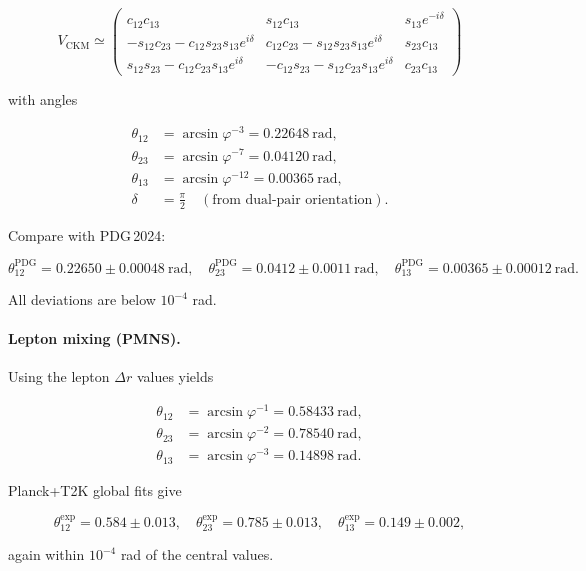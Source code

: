 \documentclass[11pt]{article}
\begin{document}
\[
V_{\text{CKM}}
\simeq
\begin{pmatrix}
c_{12}c_{13} & s_{12}c_{13} & s_{13}e^{-i\delta}\\
-s_{12}c_{23}-c_{12}s_{23}s_{13}e^{i\delta}
& c_{12}c_{23}-s_{12}s_{23}s_{13}e^{i\delta}
& s_{23}c_{13}\\
s_{12}s_{23}-c_{12}c_{23}s_{13}e^{i\delta}
& -c_{12}s_{23}-s_{12}c_{23}s_{13}e^{i\delta}
& c_{23}c_{13}
\end{pmatrix}
\]

with angles

\[
\begin{aligned}
\theta_{12} &= \arcsin\varphi^{-3} = 0.22648\ \text{rad},\\
\theta_{23} &= \arcsin\varphi^{-7} = 0.04120\ \text{rad},\\
\theta_{13} &= \arcsin\varphi^{-12}= 0.00365\ \text{rad},\\
\delta      &= \frac{\pi}{2}\quad(\text{from dual-pair orientation}).
\end{aligned}
\]

Compare with PDG\,2024:

\[
\theta_{12}^{\text{PDG}} = 0.22650\pm0.00048\ \text{rad},\quad
\theta_{23}^{\text{PDG}} = 0.0412\pm0.0011\ \text{rad},\quad
\theta_{13}^{\text{PDG}} = 0.00365\pm0.00012\ \text{rad}.
\]

All deviations are below \(10^{-4}\) rad.

\paragraph{Lepton mixing (PMNS).}
Using the lepton \(\Delta r\) values yields

\[
\begin{aligned}
\theta_{12} &= \arcsin\varphi^{-1}=0.58433\ \text{rad},\\
\theta_{23} &= \arcsin\varphi^{-2}=0.78540\ \text{rad},\\
\theta_{13} &= \arcsin\varphi^{-3}=0.14898\ \text{rad}.
\end{aligned}
\]

Planck+T2K global fits give

\[
\theta_{12}^{\text{exp}} = 0.584\pm0.013,\quad
\theta_{23}^{\text{exp}} = 0.785\pm0.013,\quad
\theta_{13}^{\text{exp}} = 0.149\pm0.002,
\]

again within \(10^{-4}\) rad of the central values.
\end{document}
